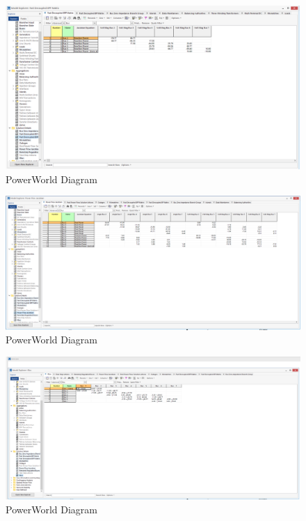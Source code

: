 \documentclass[12pt]{article}
\begin{document}
        \begin{figure}[H]
            \centerline{\includegraphics[scale=0.3]{images/PowerWorldTable7}}
            \caption{PowerWorld Diagram}
        \end{figure}
        \begin{figure}[H]
            \centerline{\includegraphics[scale=0.3]{images/PowerWorldTable8}}
            \caption{PowerWorld Diagram}
        \end{figure}
        \begin{figure}[H]
            \centerline{\includegraphics[scale=0.3]{images/PowerWorldTable9}}
            \caption{PowerWorld Diagram}
        \end{figure}
\end{document}
